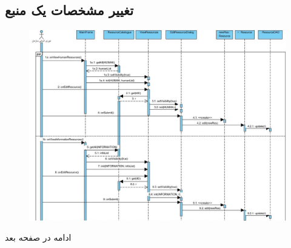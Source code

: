 \begin{landscape}
\section{تغییر مشخصات یک منبع}
\begin{figure}[H]
	\centering
	\includegraphics[scale=0.68]{img/sequence-design/EditResourceAttributes-1}
\end{figure}
ادامه در صفحه بعد\\


\end{landscape}
